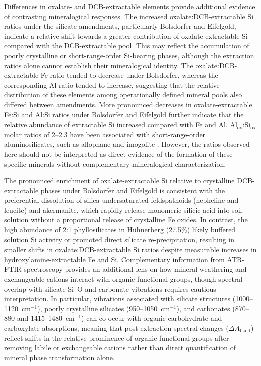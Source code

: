 \documentclass[preprint,12pt]{elsarticle}
\begin{document}
Differences in oxalate- and DCB-extractable elements provide additional evidence of contrasting mineralogical responses. The increased oxalate:DCB-extractable Si ratios under the silicate amendments, particularly Bolsdorfer and Eifelgold, indicate a relative shift towards a greater contribution of oxalate-extractable Si compared with the DCB-extractable pool. This may reflect the accumulation of poorly crystalline or short-range-order Si-bearing phases, although the extraction ratios alone cannot establish their mineralogical identity. The oxalate:DCB-extractable Fe ratio tended to decrease under Bolsdorfer, whereas the corresponding Al ratio tended to increase, suggesting that the relative distribution of these elements among operationally defined mineral pools also differed between amendments. More pronounced decreases in oxalate-extractable Fe:Si and Al:Si ratios under Bolsdorfer and Eifelgold further indicate that the relative abundance of extractable Si increased compared with Fe and Al. Al$_{\mathrm{ox}}$:Si$_{\mathrm{ox}}$ molar ratios of 2--2.3 have been associated with short-range-order aluminosilicates, such as allophane and imogolite \citep{Watanabe2023}. However, the ratios observed here should not be interpreted as direct evidence of the formation of these specific minerals without complementary mineralogical characterization. 
  
The pronounced enrichment of oxalate-extractable Si relative to crystalline DCB-extractable phases under Bolsdorfer and Eifelgold is consistent with the preferential dissolution of silica-undersaturated feldspathoids (nepheline and leucite) and \aa kermanite, which rapidly release monomeric silicic acid into soil solution without a proportional release of crystalline Fe oxides. In contrast, the high abundance of 2:1 phyllosilicates in H\"uhnerberg (27.5\%) likely buffered solution Si activity or promoted direct silicate re-precipitation, resulting in smaller shifts in oxalate:DCB-extractable Si ratios despite measurable increases in hydroxylamine-extractable Fe and Si. Complementary information from ATR-FTIR spectroscopy provides an additional lens on how mineral weathering and exchangeable cations interact with organic functional groups, though spectral overlap with silicate Si--O and carbonate vibrations requires cautious interpretation. In particular, vibrations associated with silicate structures (1000--1120~cm$^{-1}$), poorly crystalline silicates (950--1050~cm$^{-1}$), and carbonates (870--880 and 1415--1480~cm$^{-1}$) can co-occur with organic carbohydrate and carboxylate absorptions, meaning that post-extraction spectral changes ($\Delta A_{\mathrm{band}}$) reflect shifts in the relative prominence of organic functional groups after removing labile or exchangeable cations rather than direct quantification of mineral phase transformation alone.
\end{document}
